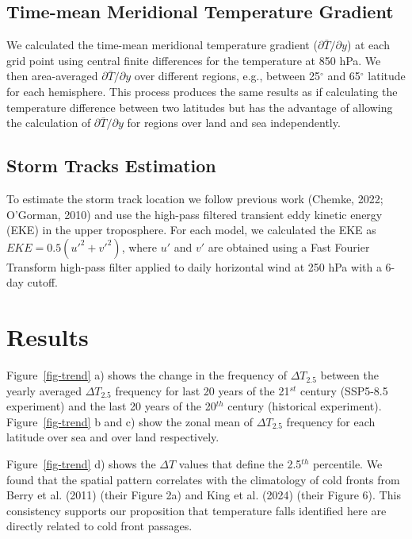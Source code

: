 \documentclass[
]{agujournal2019}
\begin{document}
\subsection{Time-mean Meridional Temperature
Gradient}\label{time-mean-meridional-temperature-gradient}

We calculated the time-mean meridional temperature gradient
(\(\partial \bar{T}/ \partial y\)) at each grid point using central
finite differences for the temperature at 850 hPa. We then area-averaged
\(\partial \bar{T}/ \partial y\) over different regions, e.g., between
25\(^{\circ}\) and 65\(^{\circ}\) latitude for each hemisphere. This
process produces the same results as if calculating the temperature
difference between two latitudes but has the advantage of allowing the
calculation of \(\partial \bar{T}/ \partial y\) for regions over land
and sea independently.

\subsection{Storm Tracks Estimation}\label{sec-storm-track}

To estimate the storm track location we follow previous work (Chemke,
2022; O'Gorman, 2010) and use the high-pass filtered transient eddy
kinetic energy (EKE) in the upper troposphere. For each model, we
calculated the EKE as \(EKE = 0.5(u'^2 + v'^2)\), where \(u'\) and
\(v'\) are obtained using a Fast Fourier Transform high-pass filter
applied to daily horizontal wind at 250 hPa with a 6-day cutoff.

\section{Results}\label{results}

Figure~\ref{fig-trend} a) shows the change in the frequency of
\(\Delta T_{2.5}\) between the yearly averaged \(\Delta T_{2.5}\)
frequency for last 20 years of the 21\(^{st}\) century (SSP5-8.5
experiment) and the last 20 years of the 20\(^{th}\) century (historical
experiment). Figure~\ref{fig-trend} b and c) show the zonal mean of
\(\Delta T_{2.5}\) frequency for each latitude over sea and over land
respectively.

Figure~\ref{fig-trend} d) shows the \(\Delta T\) values that define the
2.5\(^{th}\) percentile. We found that the spatial pattern correlates
with the climatology of cold fronts from Berry et al. (2011) (their
Figure 2a) and King et al. (2024) (their Figure 6). This consistency
supports our proposition that temperature falls identified here are
directly related to cold front passages.
\end{document}
